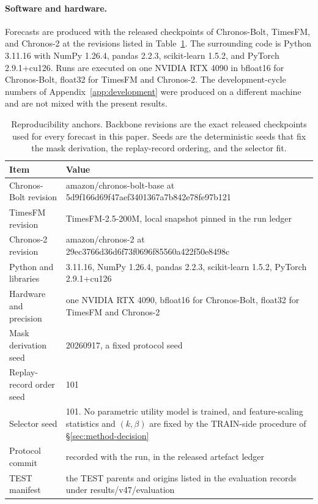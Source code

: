 \documentclass{article}
\begin{document}
\paragraph{Software and hardware.} Forecasts are produced with the released checkpoints of
Chronos-Bolt, TimesFM, and Chronos-2 at the revisions listed in Table~\ref{tab:app-repro}.
The surrounding code is Python 3.11.16 with NumPy 1.26.4, pandas
2.2.3, scikit-learn 1.5.2, and PyTorch 2.9.1+cu126. Runs are
executed on one NVIDIA RTX 4090 in bfloat16 for Chronos-Bolt, float32 for TimesFM and Chronos-2. The development-cycle numbers of
Appendix~\ref{app:development} were produced on a different machine and are not mixed with the
present results.

\begin{table}[htbp]
  \caption{Reproducibility anchors. Backbone revisions are the exact released checkpoints used
  for every forecast in this paper. Seeds are the deterministic seeds that fix the mask
  derivation, the replay-record ordering, and the selector fit.}
  \label{tab:app-repro}
  \centering
  \small
  \setlength{\tabcolsep}{4pt}
  \begin{tabular}{@{}l p{}@{}}
    \toprule
    Item & Value \\
    \midrule
    Chronos-Bolt revision   & amazon/chronos-bolt-base at 5d9f166d69f47aef3401367a7b842e78fe97b121 \\
    TimesFM revision        & TimesFM-2.5-200M, local snapshot pinned in the run ledger \\
    Chronos-2 revision      & amazon/chronos-2 at 29ec3766d36d6f73f0696f85560a422f50e8498c \\
    Python and libraries    & 3.11.16, NumPy 1.26.4, pandas 2.2.3, scikit-learn 1.5.2, PyTorch 2.9.1+cu126 \\
    Hardware and precision  & one NVIDIA RTX 4090, bfloat16 for Chronos-Bolt, float32 for TimesFM and Chronos-2 \\
    Mask derivation seed    & 20260917, a fixed protocol seed \\
    Replay-record order seed & 101 \\
    Selector seed             & 101. No parametric utility model is trained, and feature-scaling statistics and $(k,\beta)$ are fixed by the TRAIN-side procedure of \S\ref{sec:method-decision} \\
    Protocol commit         & recorded with the run, in the released artefact ledger \\
    TEST manifest           & the TEST parents and origins listed in the evaluation records under results/v47/evaluation \\
    \bottomrule
  \end{tabular}
\end{table}
\end{document}
